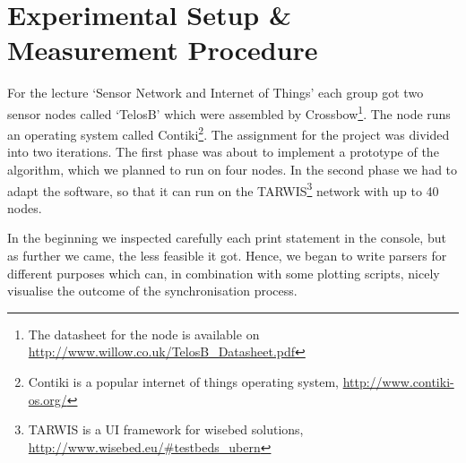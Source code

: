 \documentclass{llncs}
\begin{document}
\section{Experimental Setup \& Measurement Procedure}
For the lecture `Sensor Network and Internet of Things' each group got two sensor nodes called `TelosB' which were assembled by Crossbow\footnote{The datasheet for the node is available on \url{http://www.willow.co.uk/TelosB_Datasheet.pdf}}. The node runs an operating system called Contiki\footnote{Contiki is a popular internet of things operating system, \url{http://www.contiki-os.org/}}. The assignment for the project was divided into two iterations. The first phase was about to implement a prototype of the algorithm, which we planned to run on four nodes. In the second phase we had to adapt the software, so that it can run on the TARWIS\footnote{TARWIS is a UI framework for wisebed solutions, \url{http://www.wisebed.eu/\#testbeds_ubern}} network with up to 40 nodes.

\noindent In the beginning we inspected carefully each print statement in the console, but as further we came, the less feasible it got. Hence, we began to write parsers for different purposes which can, in combination with some plotting scripts, nicely visualise the outcome of the synchronisation process.
\end{document}
